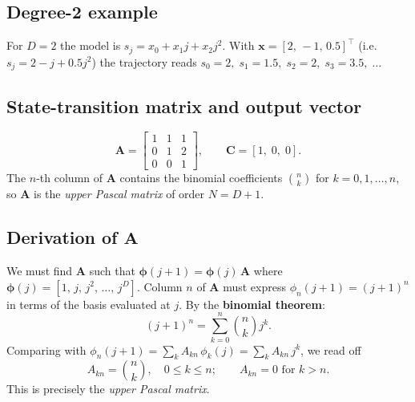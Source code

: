 \documentclass[11pt, a4paper]{article}
\theoremstyle{definition}
\newcommand{\vx}{\bm{x}}
\newcommand{\vC}{\bm{C}}
\newcommand{\mA}{\bm{A}}
\newcommand{\mphi}{\bm{\phi}}
\begin{document}
\subsection{Degree-2 example}

For $D=2$ the model is $s_j = x_0 + x_1 j + x_2 j^2$.  With
$\vx = [2,\,-1,\,0.5]^\top$ (i.e.\ $s_j = 2 - j + 0.5 j^2$) the
trajectory reads $s_0=2,\; s_1=1.5,\; s_2=2,\; s_3=3.5,\;\ldots$

\begin{center}
\end{center}

\subsection{State-transition matrix and output vector}

\begin{equation}
  \mA = \begin{bmatrix}
    1 & 1 & 1 \\
    0 & 1 & 2 \\
    0 & 0 & 1
  \end{bmatrix},
  \qquad
  \vC = [1,\; 0,\; 0].
\end{equation}
The $n$-th column of $\mA$ contains the binomial coefficients
$\binom{n}{k}$ for $k = 0, 1, \ldots, n$, so $\mA$ is the \emph{upper
Pascal matrix} of order $N = D+1$.

\subsection{Derivation of \texorpdfstring{$\mA$}{A}}

We must find $\mA$ such that $\mphi(j+1) = \mphi(j)\,\mA$ where
$\mphi(j) = [1,\, j,\, j^2,\, \ldots,\, j^D]$.  Column $n$ of $\mA$
must express $\phi_n(j+1) = (j+1)^n$ in terms of the basis evaluated
at $j$.  By the \textbf{binomial theorem}:
\begin{equation}
  (j+1)^n = \sum_{k=0}^{n} \binom{n}{k} j^k.
  \label{eq:binomial}
\end{equation}
Comparing with $\phi_n(j+1) = \sum_k A_{kn}\,\phi_k(j) = \sum_k A_{kn}\,
j^k$, we read off
\[
  A_{kn} = \binom{n}{k}, \quad 0 \leq k \leq n; \qquad A_{kn} = 0 \text{ for }
  k > n.
\]
This is precisely the \emph{upper Pascal matrix}.
\end{document}
